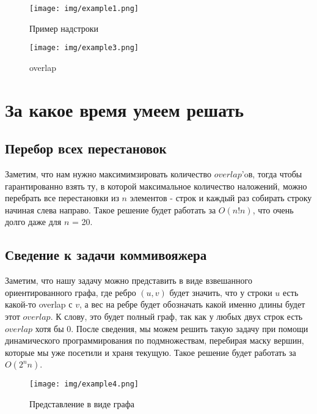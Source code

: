 \documentclass{article}
\begin{document}
\begin{figure}[htbp]
    \center
    \texttt{[image: img/example1.png]}
    \caption{Пример надстроки}
\end{figure}
\begin{figure}[htbp]
    \center
    \texttt{[image: img/example3.png]}
    \caption{overlap}
\end{figure}


\newpage
\section{За какое время умеем решать}
\subsection{Перебор всех перестановок}
Заметим, что нам нужно максимимзировать количество ${overlap}$'oв, тогда чтобы гарантированно взять ту, в которой максимальное количество наложений, можно перебрать все перестановки из ${n}$ элементов - строк и каждый раз собирать строку начиная слева направо. \newline
Такое решение будет работать за ${O(n!n)}$, что очень долго даже для $n$ = 20. 

\subsection{Сведение к задачи коммивояжера}
Заметим, что нашу задачу можно представить в виде взвешанного ориентированного графа, где ребро $(u, v)$ будет значить, что у строки ${u}$ есть какой-то {overlap} с ${v}$, а вес на ребре будет обозначать какой именно длины будет этот ${overlap}$. К слову, это будет полный граф, так как у любых двух строк есть ${overlap}$ хотя бы $0$. \newline
После сведения, мы можем решить такую задачу при помощи динамического программирования по подмножествам, перебирая маску вершин, которые мы уже посетили и храня текущую.
\newline
Такое решение будет работать за ${O(2^n n)}$.

\begin{figure}[htbp]
    \center
    \texttt{[image: img/example4.png]}
    \caption{Представление в виде графа}
\end{figure}
\end{document}
